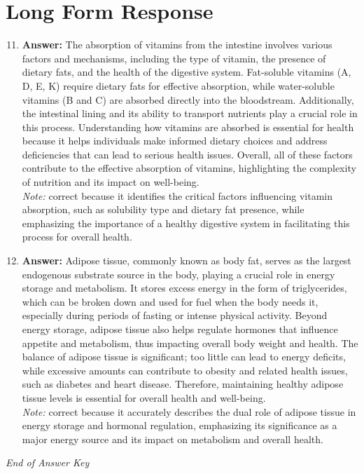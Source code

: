 \documentclass[12pt]{article}
\begin{document}
\section*{Long Form Response}
\begin{enumerate}[label=\arabic*.]
\setcounter{enumi}{10}
\item \textbf{Answer:} The absorption of vitamins from the intestine involves various factors and mechanisms, including the type of vitamin, the presence of dietary fats, and the health of the digestive system. Fat-soluble vitamins (A, D, E, K) require dietary fats for effective absorption, while water-soluble vitamins (B and C) are absorbed directly into the bloodstream. Additionally, the intestinal lining and its ability to transport nutrients play a crucial role in this process. Understanding how vitamins are absorbed is essential for health because it helps individuals make informed dietary choices and address deficiencies that can lead to serious health issues. Overall, all of these factors contribute to the effective absorption of vitamins, highlighting the complexity of nutrition and its impact on well-being.
\\ \textit{Note:} correct because it identifies the critical factors influencing vitamin absorption, such as solubility type and dietary fat presence, while emphasizing the importance of a healthy digestive system in facilitating this process for overall health.
\item \textbf{Answer:} Adipose tissue, commonly known as body fat, serves as the largest endogenous substrate source in the body, playing a crucial role in energy storage and metabolism. It stores excess energy in the form of triglycerides, which can be broken down and used for fuel when the body needs it, especially during periods of fasting or intense physical activity. Beyond energy storage, adipose tissue also helps regulate hormones that influence appetite and metabolism, thus impacting overall body weight and health. The balance of adipose tissue is significant; too little can lead to energy deficits, while excessive amounts can contribute to obesity and related health issues, such as diabetes and heart disease. Therefore, maintaining healthy adipose tissue levels is essential for overall health and well-being.
\\ \textit{Note:} correct because it accurately describes the dual role of adipose tissue in energy storage and hormonal regulation, emphasizing its significance as a major energy source and its impact on metabolism and overall health.
\end{enumerate}

\vfill
\noindent\textit{End of Answer Key}
\end{document}
